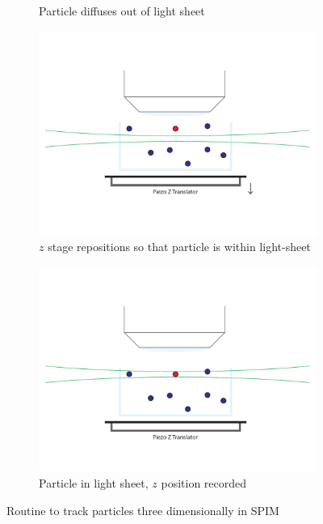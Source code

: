 \begin{figure}
\begin{subfigure}[b]{0.35\linewidth}
		\caption{Particle diffuses out of light sheet}
		\label{fig:SPIMSPT2}
	\end{subfigure}
	\begin{subfigure}[b]{0.35\linewidth}
		\centering
		\includegraphics[width=\linewidth]{tracking/3_piezo_track}
		\caption{$z$ stage repositions so that particle is within light-sheet}
		\label{fig:SPIMSPT3}
	\end{subfigure}
	\begin{subfigure}[b]{0.35\linewidth}
		\centering
		\includegraphics[width=\linewidth]{tracking/4_piezo_track}
		\caption{Particle in light sheet, $z$ position recorded}
		\label{fig:SPIMSPT4}
	\end{subfigure}
	\caption{Routine to track particles three dimensionally in SPIM}
	\label{fig:SPIMSPT}
\end{figure}

